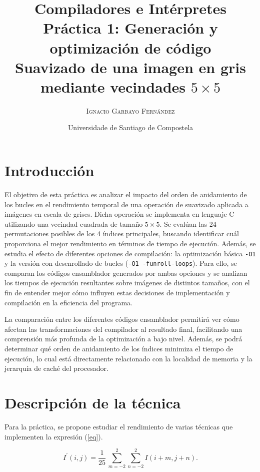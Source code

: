 \documentclass[11pt,a4paper,twoside]{article}
\title{%
	\LARGE \textbf{Compiladores e Intérpretes} \\ \vspace*{1cm} \textbf{Práctica 1: Generación y optimización de código}
	\\ \Large \textbf{Suavizado de una imagen en gris mediante vecindades $5\times 5$}}
\author{\textsc{Ignacio Garbayo Fernández}}
\date{Universidade de Santiago de Compostela}
\theoremstyle{definition}
\begin{document}
	
	\maketitle
	\thispagestyle{empty}
	
	\vspace*{1cm}
	
	\renewcommand{\contentsname}{Índice} %
	\tableofcontents


	\newpage


	\section{Introducción}
	
	El objetivo de esta práctica es analizar el impacto del orden de anidamiento de los bucles en el rendimiento temporal de una operación de suavizado aplicada a imágenes en escala de grises. Dicha operación se implementa en lenguaje C utilizando una vecindad cuadrada de tamaño $5\times 5$. Se evalúan las 24 permutaciones posibles de los 4 índices principales, buscando identificar cuál proporciona el mejor rendimiento en términos de tiempo de ejecución. Además, se estudia el efecto de diferentes opciones de compilación: la optimización básica \texttt{-O1} y la versión con desenrollado de bucles (\texttt{-O1 -funroll-loops}). Para ello, se comparan los códigos ensamblador generados por ambas opciones y se analizan los tiempos de ejecución resultantes sobre imágenes de distintos tamaños, con el fin de entender mejor cómo influyen estas decisiones de implementación y compilación en la eficiencia del programa.
	
	La comparación entre los diferentes códigos ensamblador permitirá ver cómo afectan las transformaciones del compilador al resultado final, facilitando una comprensión más profunda de la optimización a bajo nivel. Además, se podrá determinar qué orden de anidamiento de los índices minimiza el tiempo de ejecución, lo cual está directamente relacionado con la localidad de memoria y la jerarquía de caché del procesador.
	

	\section{Descripción de la técnica}
	
	Para la práctica, se propone estudiar el rendimiento de varias técnicas que implementen la expresión (\ref{eq}).
	
	\begin{equation} \label{eq}
		I^\prime (i,j) = \dfrac{1}{25}\, \sum_{m=-2}^2 \sum_{n=-2}^2 I(i+m, j+n).
	\end{equation}
\end{document}
